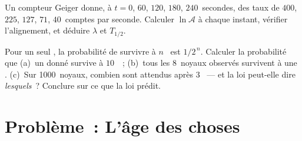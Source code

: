 \begin{exercise}[$\star\star\star$]\label{exo:g12:radioactive-decay:14}
Un compteur Geiger donne, à $t = 0$, $60$, $120$, $180$, $240$~secondes,
des taux de $400$, $225$, $127$, $71$, $40$~comptes par seconde.
Calculer $\ln \mathcal A$ à chaque instant, vérifier l'alignement, et
déduire $\lambda$ et $T_{1/2}$.
\end{exercise}

\begin{exercise}[$\star\star\star$]\label{exo:g12:radioactive-decay:15}
Pour un seul , la probabilité de
survivre à $n$~ est $1/2^{\,n}$. Calculer la probabilité que
(a)~un  donné survive à
$10$~~; (b)~tous les $8$~noyaux observés survivent à une
. (c)~Sur \num{1000}~noyaux, combien
sont attendus après $3$~ --- et la loi peut-elle dire
\emph{lesquels}~? Conclure sur ce que la loi prédit.
\end{exercise}

\section{Problème~: L'âge des choses}

